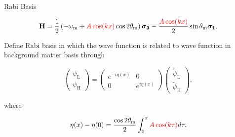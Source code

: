 \begin{frame}{Rabi Basis}



\begin{tcolorbox}[title=Hamiltonian in Background Matter Basis]
    \begin{equation*}
    \mathbf {H} = \frac{1}{2}\left( - \omega_{\mathrm{m}} + {\color{red}A\cos(kx)} \cos 2\theta_{\mathrm{m}} \right) \boldsymbol{\sigma_3} - \frac{  {\color{red}A\cos (kx)}  }{2} \sin \theta_{\mathrm{m}} \boldsymbol{\sigma_1}.
\end{equation*}
\end{tcolorbox}


\begin{tcolorbox}[title=A Better Basis]


Define Rabi basis %
in which the wave function is related to wave function in background matter basis
through

\begin{equation*}
    \begin{pmatrix}
    \psi_{\mathrm{L} } \\
    \psi_{\mathrm{H} }
    \end{pmatrix} = \begin{pmatrix}
     e^{-i \eta (x)} & 0 \\  0 & e^{i \eta (x)}
    \end{pmatrix}\begin{pmatrix}
    \tilde\psi_{\mathrm{L} }\\
    \tilde\psi_{\mathrm{H} }
    \end{pmatrix},
\end{equation*}

where

\begin{equation*}
    \eta(x) - \eta(0) = \frac{\cos 2\theta_{\mathrm{m}}}{2} \int_0^x {\color{red}A\cos(k \tau)} d\tau.
\end{equation*}

\end{tcolorbox}



\end{frame}














